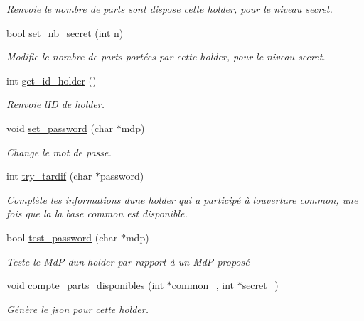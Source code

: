 \begin{DoxyCompactItemize}
\begin{DoxyCompactList}\small\item\em Renvoie le nombre de parts sont dispose cette holder, pour le niveau secret. \end{DoxyCompactList}\item 
bool \hyperlink{classt__holder_abd1722834ceb39539af2444612f28760}{set\+\_\+nb\+\_\+secret} (int n)
\begin{DoxyCompactList}\small\item\em Modifie le nombre de parts portées par cette holder, pour le niveau secret. \end{DoxyCompactList}\item 
int \hyperlink{classt__holder_a6e258c7a0de7e7f4c5508af8a0aa8378}{get\+\_\+id\+\_\+holder} ()
\begin{DoxyCompactList}\small\item\em Renvoie l\textquotesingle{}ID de holder. \end{DoxyCompactList}\item 
void \hyperlink{classt__holder_a08e5c20156dba916f67fb2861d0a79be}{set\+\_\+password} (char $\ast$mdp)
\begin{DoxyCompactList}\small\item\em Change le mot de passe. \end{DoxyCompactList}\item 
int \hyperlink{classt__holder_a350849be70b8ed9acd165ec1cf9e4e96}{try\+\_\+tardif} (char $\ast$password)
\begin{DoxyCompactList}\small\item\em Complète les informations d\textquotesingle{}une holder qui a participé à l\textquotesingle{}ouverture common, une fois que la la base common est disponible. \end{DoxyCompactList}\item 
bool \hyperlink{classt__holder_a0c5f8f994532f9bdf72f870d9c66e2b1}{test\+\_\+password} (char $\ast$mdp)
\begin{DoxyCompactList}\small\item\em Teste le MdP d\textquotesingle{}un holder par rapport à un MdP proposé \end{DoxyCompactList}\item 
void \hyperlink{classt__holder_ace602439e9c0675405f0bf6d6d46157f}{compte\+\_\+parts\+\_\+disponibles} (int $\ast$common\+\_\+, int $\ast$secret\+\_\+)
\begin{DoxyCompactList}\small\item\em Génère le json pour cette holder. \end{DoxyCompactList}\item 

\end{DoxyCompactItemize}
